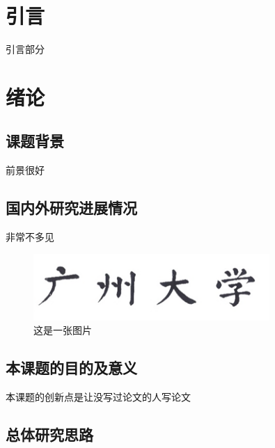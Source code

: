 \documentclass[12pt,a4paper,AutoFakeBold]{article}
\newcommand{\song}{\CJKfamily{song}}
\newcommand{\mkls}{\linespread{1.7}\selectfont}
\begin{document}
\renewcommand{\contentsname}{\centerline{\zihao{-2}\textbf{目录}}}
\linespread{1.2}\selectfont{
	\tableofcontents
}

\vspace{5cm}

{
\mkls%
\song%


\section*{引\quad 言}


引言部分


\newpage
\setcounter{section}{1}
\section{绪论}


\subsection{课题背景}

前景很好
\cite{beckSurveyMetaReinforcementLearning2023}
\subsection{国内外研究进展情况}
非常不多见

\begin{figure}
	\centering
	\includegraphics[width=0.8\textwidth]{logo/gzhu.png}
	\caption{这是一张图片}
	\label{fig:1}
\end{figure}

\subsection{本课题的目的及意义}
本课题的创新点是让没写过论文的人写论文

\subsection{总体研究思路}

}
\end{document}
